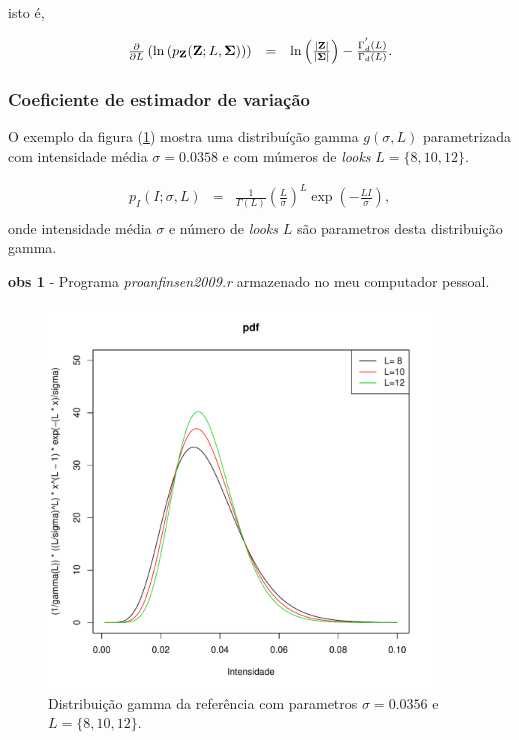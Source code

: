 \documentclass[12pt,a4paper]{article}
\begin{document}
isto é, 

\begin{equation}\label{sec41eqn8}
\begin{array}{ccc}
	\frac{\partial}{\partial L}\left(\ln{\left(p_{{\bf Z}}({\bf Z};L,{\bf \Sigma})\right)}\right)&=&\ln{\left(\frac{|{\bf Z}|}{|{\bf \Sigma}|}\right)} - \frac{\Gamma^{'}_d(L)}{\Gamma_d(L)}. \\
\end{array}
\end{equation}
\subsubsection{Coeficiente de estimador de variação}

 O exemplo da figura (\ref{sec41fig1}) mostra uma distribuíção gamma $g(\sigma, L)$ parametrizada com intensidade média $\sigma=0.0358$ e com múmeros de {\it looks} $L=\{8,10,12\}$.

\begin{equation}\label{sec41eqn6}
\begin{array}{ccc}
	p_{I}(I;\sigma,L)&=&\frac{1}{\Gamma(L)}\left(\frac{L}{\sigma}\right)^L \exp(-\frac{LI}{\sigma}), \\
\end{array}
\end{equation}
onde intensidade média $\sigma$ e número de {\it looks} $L$ são parametros desta distribuição gamma.

{\bf obs 1} - Programa {\it proanfinsen2009.r} armazenado no meu computador pessoal.

\begin{figure}[!h]
\centering
\includegraphics[width=4.0in]{fig_1_anfinsen_2009.pdf}
	\caption{Distribuição gamma da referência \cite{anfinsen2009} com parametros $\sigma=0.0356$ e $L=\{8,10,12\}$.}
\label{sec41fig1}
\end{figure}
\end{document}
